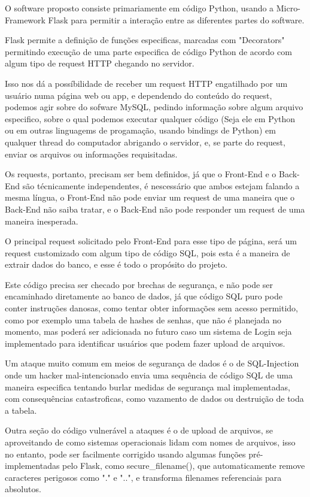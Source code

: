 O software proposto consiste primariamente em código Python, usando a Micro-Framework Flask para permitir a interação entre as diferentes partes do software.

Flask permite a definição de funções especificas, marcadas com "Decorators" permitindo execução de uma parte especifica de código Python de acordo com algum tipo de request HTTP chegando no servidor.

Isso nos dá a possíbilidade de receber um request HTTP engatilhado por um usuário numa página web ou app, e dependendo do conteúdo do request, podemos agir sobre do sofware MySQL, pedindo informação sobre algum arquivo especifico, sobre o qual podemos executar qualquer código (Seja ele em Python ou em outras linguagems de progamação, usando bindings de Python) em qualquer thread do computador abrigando o servidor, e, se parte do request, enviar os arquivos ou informações requisitadas.

Os requests, portanto, precisam ser bem definidos, já que o Front-End e o Back-End são técnicamente independentes, é nescessário que ambos estejam falando a mesma língua, o Front-End não pode enviar um request de uma maneira que o Back-End não saiba tratar, e o Back-End não pode responder um request de uma maneira inesperada.

O principal request solicitado pelo Front-End para esse tipo de página, será um request customizado com algum tipo de código SQL, pois esta é a maneira de extrair dados do banco, e esse é todo o propósito do projeto.

Este código precisa ser checado por brechas de segurança, e não pode ser encaminhado diretamente ao banco de dados, já que código SQL puro pode conter instruções danosas, como tentar obter informações sem acesso permitido, como por exemplo uma tabela de hashes de senhas, que não é planejada no momento, mas poderá ser adicionada no futuro caso um sistema de Login seja implementado para identificar usuários que podem fazer upload de arquivos.

Um ataque muito comum em meios de segurança de dados é o de SQL-Injection onde um hacker mal-intencionado envia uma sequência de código SQL de uma maneira especifica tentando burlar medidas de segurança mal implementadas, com consequências catastroficas, como vazamento de dados ou destruição de toda a tabela.

Outra seção do código vulnerável a ataques é o de upload de arquivos, se aproveitando de como sistemas operacionais lidam com nomes de arquivos, isso no entanto, pode ser facilmente corrigido usando algumas funções pré-implementadas pelo Flask, como secure_filename(), que automaticamente remove caracteres perigosos como "." e "..", e transforma filenames referenciais para absolutos.

